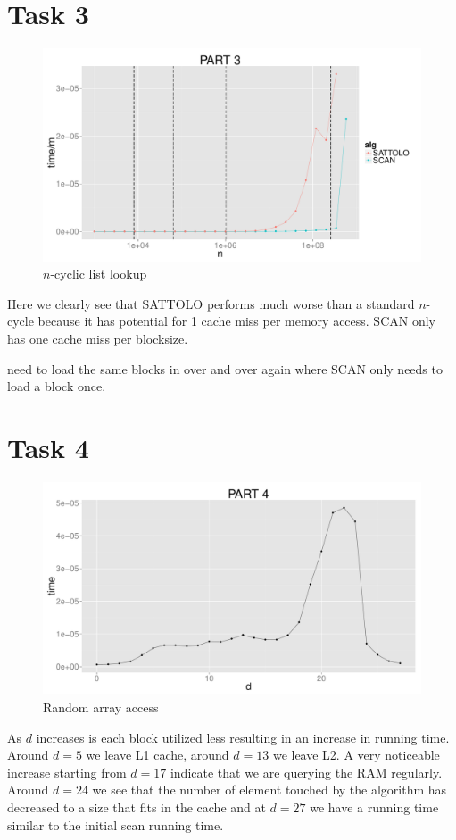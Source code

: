 \documentclass{article}
\begin{document}
\section*{Task 3}
\begin{figure}[H]
    \centering
    \includegraphics[width=\textwidth]{images/part3.pdf}
    \caption{$n$-cyclic list lookup}
    \label{fig:awesome_image}
\end{figure}

Here we clearly see that SATTOLO performs much worse than a standard $n$-cycle 
because it has potential for 1 cache miss per memory access. SCAN only has one 
cache miss per blocksize. 

need to load the same blocks in over and over again where SCAN
only needs to load a block once.
\section*{Task 4}
\begin{figure}[H]
    \centering
    \includegraphics[width=\textwidth]{images/part4.pdf}
    \caption{Random array access}
    \label{fig:awesome_image}
\end{figure}
As $d$ increases is each block utilized less resulting in an increase in running 
time. Around $d=5$ we leave L1 cache, around $d=13$ we leave L2. A very 
noticeable increase starting from $d=17$ indicate that we are querying the RAM 
regularly. Around $d=24$ we see that the number of element touched by the 
algorithm has decreased to a size that fits in the cache and at $d=27$ we have a 
running time similar to the initial scan running time.  
\end{document}
